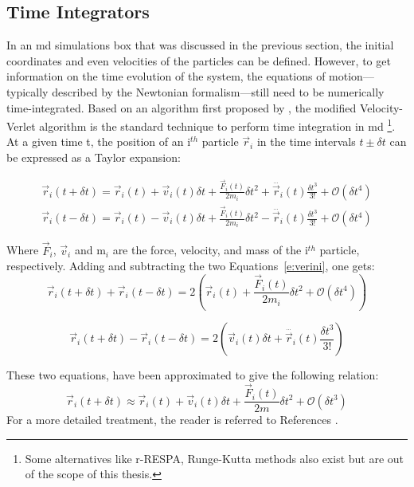 \subsection{Time Integrators}
In an \gls{md} simulations box that was discussed in the previous section, the initial coordinates and even velocities of the particles can be defined. However, to get information on the time evolution of the system, the equations of motion---typically described by the Newtonian formalism---still need to be numerically time-integrated. Based on an algorithm first proposed by \textcite{Verlet1967}, the modified Velocity-Verlet algorithm \cite{Swope1982} is the standard technique to perform time integration in \gls{md} \footnote{Some alternatives like r-RESPA, Runge-Kutta methods also exist but are out of the scope of this thesis.}. At a given time t, the position of an i$^{th}$  particle $\vec{r}_i$ in  the time intervals $t \pm \delta t$ can be expressed as a Taylor expansion:

\begin{equation} \label{e:verini}
\begin{gathered}
	\vec{r}_i(t+\delta t) = \vec{r}_i(t) + \vec{v}_i(t)\delta t + \frac{\vec{F}_i(t)}{2m_i}\delta t^2 + \dddot{\vec{r}_i}(t) \frac{\delta t^3}{3!} + \mathcal{O}(\delta t ^4) \\
	\vec{r}_i(t-\delta t) = \vec{r}_i(t) - \vec{v}_i(t)\delta t + \frac{\vec{F}_i(t)}{2m_i}\delta t^2 - \dddot{\vec{r}_i}(t) \frac{\delta t^3}{3!} + \mathcal{O}(\delta t ^4) 
\end{gathered}
\end{equation}

Where $\vec{F}_i$, $\vec{v}_i$ and m$_i$ are the force, velocity, and mass of the i$^{th}$ particle, respectively. Adding and subtracting the two Equations~\ref{e:verini}, one gets:
\begin{equation}
\vec{r}_i(t+\delta t) + \vec{r}_i(t-\delta t) = 2 \left(\vec{r}_i(t) + \frac{\vec{F}_i(t)}{2m_i}\delta t^2 + \mathcal{O}(\delta t ^4) \right)
\end{equation}

\begin{equation}
\vec{r}_i(t+\delta t) - \vec{r}_i(t-\delta t) = 2 \left(\vec{v}_i(t)\delta t + \dddot{\vec{r}_i}(t) \frac{\delta t^3}{3!}  \right)
\end{equation}

These two equations, have been approximated to give the following relation:
\begin{equation} \label{e:rvelver}
\vec{r}_i(t+\delta t) \approx \vec{r}_i(t) + \vec{v}_i(t)\delta t + \frac{\vec{F}_i(t)}{2m}\delta t^2 +\mathcal{O}(\delta t ^3)  %
\end{equation}
For a more detailed treatment, the reader is referred to References \cite{Frenkel1997,Lee2016}.

